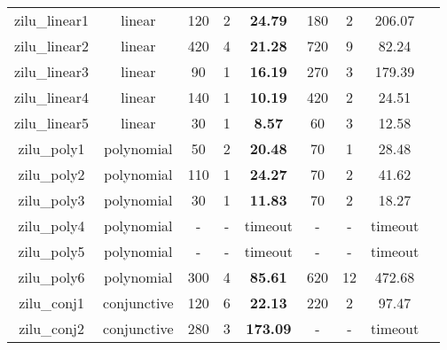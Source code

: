 \begin{table}[t]
\begin{tabular}{l c | c c c | c c c | c }
\multicolumn{1}{|c|}{zilu\_linear1}         			&linear 		&120 &2 &\textbf{24.79}  		&180 &2   &206.07  			&\multicolumn{1}{|c|}{\xmark} \\
\multicolumn{1}{|c|}{zilu\_linear2}         			&linear 		&420 &4 &\textbf{21.28}  		&720  &9  &82.24  			&\multicolumn{1}{|c|}{\cmark} \\
\multicolumn{1}{|c|}{zilu\_linear3}         			&linear 		&90 &1 &\textbf{16.19}  		&270 &3  &179.39  			&\multicolumn{1}{|c|}{\cmark} \\
\multicolumn{1}{|c|}{zilu\_linear4}         			&linear 		&140 &1 &\textbf{10.19}  		&420 &2  &24.51  			&\multicolumn{1}{|c|}{\cmark} \\
\multicolumn{1}{|c|}{zilu\_linear5}         			&linear 		&30 &1 &\textbf{8.57}  			&60 &3   &12.58  			&\multicolumn{1}{|c|}{\cmark} \\

\multicolumn{1}{|c|}{zilu\_poly1}         				&polynomial 	&50 &2 &\textbf{20.48}			&70 &1 &28.48  				&\multicolumn{1}{|c|}{\xmark} \\
\multicolumn{1}{|c|}{zilu\_poly2}         				&polynomial 	&110  &1 &\textbf{24.27}  		&70   &2 &41.62  			&\multicolumn{1}{|c|}{\xmark} \\
\multicolumn{1}{|c|}{zilu\_poly3}         				&polynomial 	&30 &1 &\textbf{11.83}  		&70  &2  &18.27  			&\multicolumn{1}{|c|}{\xmark} \\
\multicolumn{1}{|c|}{zilu\_poly4}         				&polynomial 	&- &-&timeout  				&-  &-  &timeout 			&\multicolumn{1}{|c|}{\xmark} \\
\multicolumn{1}{|c|}{zilu\_poly5}         				&polynomial 	&- &- &timeout  			&-  &-  &timeout  		&\multicolumn{1}{|c|}{\xmark} \\
\multicolumn{1}{|c|}{zilu\_poly6}         				&polynomial 	&300 &4 &\textbf{85.61}  		&620   &12 &472.68  		&\multicolumn{1}{|c|}{\xmark} \\

\multicolumn{1}{|c|}{zilu\_conj1}         				&conjunctive 	&120 &6 &\textbf{22.13}  		&220  &2  &97.47  			&\multicolumn{1}{|c|}{\xmark} \\
\multicolumn{1}{|c|}{zilu\_conj2}         				&conjunctive 	&280 &3 &\textbf{173.09}  		&-  &-  &timeout  		&\multicolumn{1}{|c|}{\cmark} \\


\end{tabular}
\end{table}

